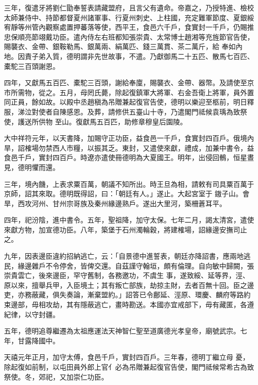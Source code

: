 \begin{pinyinscope}
 三年，復遣牙將劉仁勖奉誓表請藏盟府，且言父有遺命。帝嘉之，乃授特進、檢校太師兼侍中、持節都督夏州諸軍事、行夏州刺史、上柱國，充定難軍節度、夏銀綏宥靜等州管內觀察處置押蕃落等使，西平王，食邑六千戶，食實封一千戶，仍賜推忠保順亮節翊戴功臣。遣內侍左右班都知張崇貴、太常博士趙湘等充旌節官告使，賜襲衣、金帶、銀鞍勒馬、銀萬兩、絹萬匹、錢三萬貫、茶二萬斤，給
 奉如內地。因責子弟入質，德明謂非先世故事，不遣。乃獻御馬二十五匹、散馬七百匹、橐駝三百頭謝恩。



 四年，又獻馬五百匹、橐駝三百頭，謝給奉廩，賜襲衣、金帶、器幣。及請使至京市所需物，從之。五月，母罔氏薨，除起復鎮軍大將軍、右金吾衛上將軍，員外置同正員，餘如故。以殿中丞趙稹為吊贈兼起復官告使，德明以樂迎至柩前，明日釋服，涕泣對使者自陳感恩。及葬，請修供五臺山十寺，乃遣閣門祗候袁瑀為致祭使，護送所供物
 至山。復獻馬五百匹，助修章穆皇后園陵。



 大中祥符元年，以天書降，加賜守正功臣，益食邑一千戶，食實封四百戶。俄境內旱，詔榷場勿禁西人市糧，以振其乏。東封，又遣使來獻，禮成，加兼中書令，益食邑千戶，實封四百戶。時遼亦遣使冊德明為大夏國王。明年，出侵回鶻，恒星晝見，德明懼而還。



 三年，境內饑，上表求粟百萬，朝議不知所出。時王旦為相，請敕有司具粟百萬于京師，詔其來取。德明既得詔，曰：「朝廷有人。」遂止。大起宮室于
 𨫼子山。會旱，西攻河州、甘州宗哥族及秦州緣邊熟戶。遂出大里河，築柵蒼耳平。



 四年，祀汾陰，進中書令。五年，聖祖降，加守太保。七年二月，謁太清宮，遣使來獻方物，加宣德功臣。八年，築堡于石州濁輪穀，將建榷場，詔緣邊安撫司止之。



 九年，因表邊臣違約招納逃亡，云：「自景德中進誓表，朝廷亦降詔書，應兩地逃民，緣邊雜戶不令停舍，皆俾交還。自茲謹守翰垣，頗有倫理。自向敏中歸闕，張崇貴雲亡，後來邊臣，罕守舊制，各務邀功，不虞生
 事，遂致綏、延等界，涇、原以來，擅舉兵甲，入臣境土；其有叛亡部族，劫掠主財，去者百無十回。臣之邊吏，亦務蔽藏，俱失奏論，漸棄盟約。」詔答已令鄜延、涇原、環慶、麟府等路約束邊部，毋相攻劫，其有隱蔽逃亡，畫時勘送。本國亦宜戒部下，毋有藏匿，各遵紀律，以守封疆。



 五年，德明追尊繼遷為太祖應運法天神智仁聖至道廣德光孝皇帝，廟號武宗。七年，甘露降國中。



 天禧元年正月，加守太傅，食邑千戶，實封四百戶。三年春，德明丁繼立母
 憂，除起復如前制，以屯田員外郎上官亻必為吊贈兼起復官告使，閣門祗候常希古為致祭使。冬，郊祀，又加崇仁功臣。




\end{pinyinscope}
